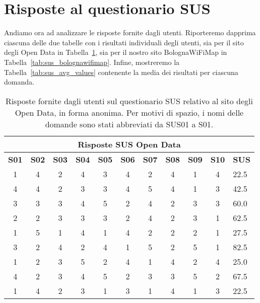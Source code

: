 \section{Risposte al questionario SUS}
Andiamo ora ad analizzare le risposte fornite dagli utenti. Riporteremo dapprima ciascuna delle due tabelle con i risultati individuali degli utenti, sia per il sito degli Open Data in Tabella~\ref{tab:sus_opendata}, sia per il nostro sito BolognaWiFiMap in Tabella~\ref{tab:sus_bolognawifimap}. Infine, mostreremo la Tabella~\ref{tab:sus_avg_values} contenente la media dei risultati per ciascuna domanda.

\begin{center}
    \begin{table}[H]
        \centering
        \begin{tabularx}{\textwidth}{|c|c|c|c|c|c|c|c|c|c|X|}
            \hline
            \multicolumn{11}{|c|}{\textbf{Risposte SUS Open Data}} \\
            \hline
            \textbf{S01} & \textbf{S02} & \textbf{S03} & \textbf{S04} & \textbf{S05} & \textbf{S06} & \textbf{S07} & \textbf{S08} & \textbf{S09} & \textbf{S10} & \textbf{SUS} \\
            \hline
            1 & 4 & 2 & 4 & 3 & 4 & 2 & 4 & 1 & 4 & 22.5 \\
            4 & 4 & 2 & 3 & 3 & 4 & 5 & 4 & 1 & 3 & 42.5 \\
            3 & 3 & 3 & 4 & 5 & 2 & 4 & 2 & 3 & 3 & 60.0 \\
            2 & 2 & 3 & 3 & 3 & 2 & 4 & 2 & 3 & 1 & 62.5 \\
            1 & 5 & 1 & 4 & 1 & 4 & 2 & 2 & 2 & 1 & 27.5 \\
            3 & 2 & 4 & 2 & 4 & 1 & 5 & 2 & 5 & 1 & 82.5 \\
            1 & 2 & 3 & 5 & 2 & 4 & 1 & 4 & 2 & 4 & 25.0 \\
            4 & 2 & 3 & 4 & 5 & 2 & 3 & 3 & 5 & 2 & 67.5 \\
            1 & 4 & 2 & 3 & 1 & 3 & 1 & 4 & 1 & 3 & 22.5 \\
            \hline
        \end{tabularx}
        \caption[Risposte del questionario SUS sul sito degli Open Data]{Risposte fornite dagli utenti sul questionario SUS relativo al sito degli Open Data, in forma anonima. Per motivi di spazio, i nomi delle domande sono stati abbreviati da SUS01 a S01.}
        \label{tab:sus_opendata}
    \end{table}
\end{center}

